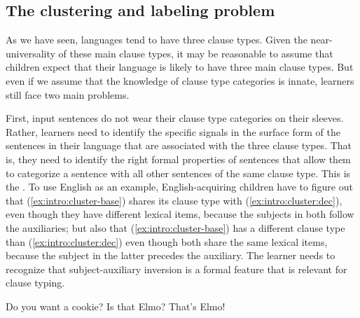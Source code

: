 \subsection{The clustering and labeling problem}
\label{sec:intro:cl:problem}

As we have seen, languages tend to have three clause types.  Given the near-universality of these main clause types, it may be reasonable to assume  that children expect that their language is likely to have three main clause types. But even if we assume that the knowledge of clause type categories is innate, learners still face two main problems.

First, input sentences do not wear their clause type categories on their sleeves. Rather, learners need to identify the specific signals in the surface form of the sentences in their language that are associated with the three clause types. That is, they need to identify the right formal properties of sentences that allow them to categorize a sentence with all other sentences of the same clause type. This is the .
To use English as an example, English-acquiring children have to figure out that (\ref{ex:intro:cluster-base}) shares its clause type with (\ref{ex:intro:cluster:dec}), even though they have different lexical items, because the subjects in both follow the auxiliaries; but also that (\ref{ex:intro:cluster-base}) has a different clause type than (\ref{ex:intro:cluster:dec}) even though both share the same lexical items, because the subject in the latter precedes the auxiliary. The learner needs to recognize that subject-auxiliary inversion is a formal feature that is relevant for clause typing.

Do you want a cookie?
\eex
{}
\bxl\label{ex:intro:cluster:int}
Is that Elmo?
\ex\label{ex:intro:cluster:dec}
That’s Elmo!
\exl
\eex

